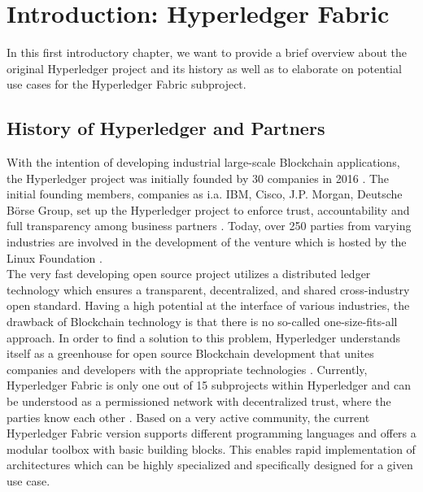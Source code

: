 \section{Introduction: Hyperledger Fabric}
In this first introductory chapter, we want to provide a brief overview about the original Hyperledger project and its history as well as to elaborate on potential use cases for the Hyperledger Fabric subproject.

\subsection{History of Hyperledger and Partners}
With the intention of developing industrial large-scale Blockchain applications, the Hyperledger project was initially founded by 30 companies in 2016 \cite{Hyperledger2019}. The initial founding members, companies as i.a. IBM, Cisco, J.P. Morgan, Deutsche B{\"o}rse Group, set up the Hyperledger project to enforce trust, accountability and full transparency among business partners \cite{TheLinuxFoundation2016}. Today, over 250 parties from varying industries are involved in the development of the venture which is hosted by the Linux Foundation \cite{TheLinuxFoundation2018}. \\ 
The very fast developing open source project utilizes a distributed ledger technology which ensures a transparent, decentralized, and shared cross-industry open standard. Having a high potential at the interface of various industries, the drawback of Blockchain technology is that there is no so-called one-size-fits-all approach. In order to find a solution to this problem, Hyperledger understands itself as a greenhouse for open source Blockchain development that unites companies and developers with the appropriate technologies \cite[p. 8]{Blummer2018}.  Currently, Hyperledger Fabric is only one out of 15 subprojects within Hyperledger and can be understood as a permissioned network with decentralized trust, where the parties know each other \cite{Fabric2019}. Based on a very active community, the current Hyperledger Fabric version supports different programming languages and offers a modular toolbox with basic building blocks. This enables rapid implementation of architectures which can be highly specialized and specifically designed for a given use case.


